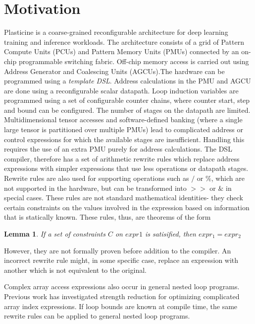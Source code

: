 \newtheorem{theorem}{Lemma}

\hypertarget{motivation}{%
\section{Motivation}\label{motivation}}

Plasticine \cite{plasticine} is a coarse-grained reconfigurable
architecture for deep learning training and inference workloads. The
architecture consists of a grid of Pattern Compute Units (PCUs) and
Pattern Memory Units (PMUs) connected by an on-chip programmable
switching fabric. Off-chip memory access is carried out using Address
Generator and Coalescing Units (AGCUs).The hardware can be programmed
using a \emph{template DSL}. Address calculations in the PMU and AGCU
are done using a reconfigurable scalar datapath.\cite{plasticine} Loop
induction variables are programmed using a set of configurable counter
chains, where counter start, step and bound can be configured. The
number of stages on the datapath are limited. Multidimensional tensor
accesses and software-defined banking (where a single large tensor is
partitioned over multiple PMUs) lead to complicated address or control
expressions for which the available stages are insufficient. Handling
this requires the use of an extra PMU purely for address calculations.
The DSL compiler, therefore has a set of arithmetic rewrite rules which
replace address expressions with simpler expressions that use less
operations or datapath stages. Rewrite rules are also used for
supporting operations such as \(/\) or \(\%\), which are not supported
in the hardware, but can be transformed into \(>>\) or \(\&\) in special
cases. These rules are not standard mathematical identities- they check
certain constraints on the values involved in the expression based on
information that is statically known. These rules, thus, are theorems of
the form

\begin{theorem}
    If a set of constraints $C$ on $expr1$ is satisified, then $ expr_1 = expr_2 $
\end{theorem}

However, they are not formally proven before addition to the compiler.
An incorrect rewrite rule might, in some specific case, replace an
expression with another which is not equivalent to the original.

Complex array access expressions also occur in general nested loop
programs. Previous work\cite{strength} has investigated strength
reduction for optimizing complicated array index expressions. If loop
bounds are known at compile time, the same rewrite rules can be applied
to general nested loop programs.

